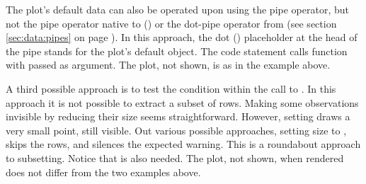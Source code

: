 \documentclass[krantz2]{krantz}\usepackage{knitr}
\begin{document}
\begin{explainbox}
The plot's default data can also be operated upon using the  pipe operator, but not the pipe operator native to \Rlang (\Roperator{\textbar >}) or the dot-pipe operator from  (see section \ref{sec:data:pipes} on page \pageref{sec:data:pipes}). In this approach, the dot () placeholder at the head of the pipe stands for the plot's default  object. The code statement calls function  with  passed as argument. The plot, not shown, is as in the example above.

\begin{knitrout}\footnotesize
{}\color{fgcolor}
\end{knitrout}

A third possible approach is to test the condition within the call to . In this approach it is not possible to extract a subset of rows. Making some observations invisible by reducing their size seems straightforward. However, setting  draws a very small point, still visible. Out various possible approaches, setting size to , skips the rows, and  silences the expected warning. This is a roundabout approach to subsetting. Notice that  is also needed. The plot, not shown, when rendered does not differ from the two examples above.

\begin{knitrout}\footnotesize
{}\color{fgcolor}\begin{kframe}
\begin{alltt}
\hlstd{(} 
        \hlstd{=} \hlstd{(}    \hlopt{+}
  \hlstd{(} \hlstd{=} \hlstd{)} \hlopt{+}
  \hlstd{(} \hlstd{=} \hlstd{,}
              \hlstd{=} \hlstd{(} \hlstd{=}  \hlopt{==} \hlstd{,} \hlstd{,} \hlstd{)),}
              \hlstd{=} \hlstd{)} \hlopt{+}
  \hlstd{()}
\end{alltt}
\end{kframe}
\end{knitrout}


\end{explainbox}
\end{document}
